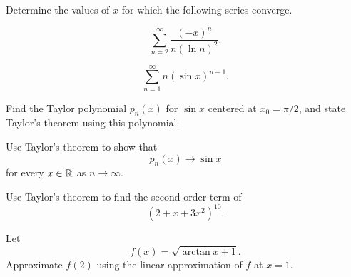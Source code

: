 \begin{problem}
Determine the values of $x$ for which the following series converge.
\begin{problemsubparts}
\item
\[
\sum_{n=2}^{\infty}\frac{(-x)^n}{n(\ln n)^2}.
\]
\item
\[
\sum_{n=1}^{\infty}n(\sin x)^{n-1}.
\]
\end{problemsubparts}
\end{problem}

\begin{problem}
\begin{problemsubparts}
\item Find the Taylor polynomial $p_n(x)$ for $\sin x$ centered at $x_0=\pi/2$, and state Taylor's theorem using this polynomial.
\item Use Taylor's theorem to show that
\[
p_n(x)\to\sin x
\]
for every $x\in\mathbb{R}$ as $n\to\infty$.
\end{problemsubparts}
\end{problem}

\begin{problem}
\begin{problemsubparts}
\item Use Taylor's theorem to find the second-order term of
\[
(2+x+3x^2)^{10}.
\]
\item Let
\[
f(x)=\sqrt{\arctan x+1}.
\]
Approximate $f(2)$ using the linear approximation of $f$ at $x=1$.
\end{problemsubparts}
\end{problem}
